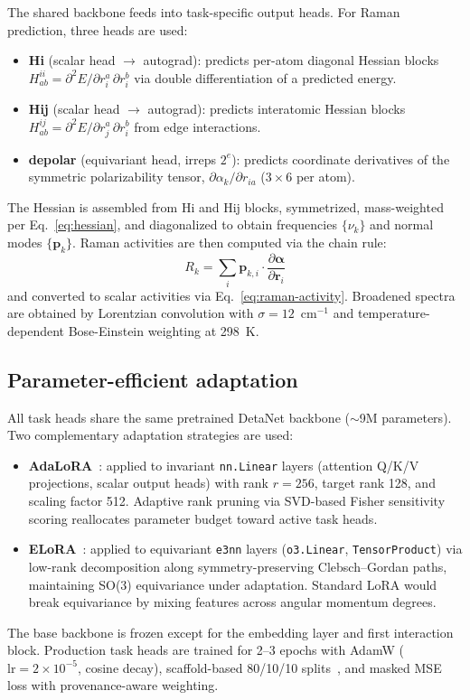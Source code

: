 \documentclass[10pt]{article}
\begin{document}
The shared backbone feeds into task-specific output heads. For Raman prediction, three heads are used:

\begin{itemize}
    \item \textbf{Hi} (scalar head $\to$ autograd): predicts per-atom diagonal Hessian blocks $H^{ii}_{ab} = \partial^2 E / \partial r^a_i\, \partial r^b_i$ via double differentiation of a predicted energy.
    \item \textbf{Hij} (scalar head $\to$ autograd): predicts interatomic Hessian blocks $H^{ij}_{ab} = \partial^2 E / \partial r^a_j\, \partial r^b_i$ from edge interactions.
    \item \textbf{depolar} (equivariant head, irreps $2^e$): predicts coordinate derivatives of the symmetric polarizability tensor, $\partial\alpha_k / \partial r_{ia}$ ($3 \times 6$ per atom).
\end{itemize}

The Hessian is assembled from Hi and Hij blocks, symmetrized, mass-weighted per Eq.~\ref{eq:hessian}, and diagonalized to obtain frequencies $\{\nu_k\}$ and normal modes $\{\mathbf{p}_k\}$. Raman activities are then computed via the chain rule:
\begin{equation}
    R_k = \sum_i \mathbf{p}_{k,i} \cdot \frac{\partial\bm{\alpha}}{\partial \mathbf{r}_i}
    \label{eq:chain-rule}
\end{equation}
and converted to scalar activities via Eq.~\ref{eq:raman-activity}. Broadened spectra are obtained by Lorentzian convolution with $\sigma = 12$~cm$^{-1}$ and temperature-dependent Bose-Einstein weighting at 298~K.

\subsection{Parameter-efficient adaptation}

All task heads share the same pretrained DetaNet backbone ($\sim$9M parameters). Two complementary adaptation strategies are used:
\begin{itemize}
    \item \textbf{AdaLoRA}~\citep{zhang2023adalora}: applied to invariant \texttt{nn.Linear} layers (attention Q/K/V projections, scalar output heads) with rank $r=256$, target rank 128, and scaling factor 512. Adaptive rank pruning via SVD-based Fisher sensitivity scoring reallocates parameter budget toward active task heads.
    \item \textbf{ELoRA}~\citep{elora}: applied to equivariant \texttt{e3nn} layers (\texttt{o3.Linear}, \texttt{TensorProduct}) via low-rank decomposition along symmetry-preserving Clebsch--Gordan paths, maintaining SO(3) equivariance under adaptation. Standard LoRA would break equivariance by mixing features across angular momentum degrees.
\end{itemize}
The base backbone is frozen except for the embedding layer and first interaction block. Production task heads are trained for 2--3 epochs with AdamW ($\mathrm{lr} = 2 \times 10^{-5}$, cosine decay), scaffold-based 80/10/10 splits~\citep{deng2023systematic}, and masked MSE loss with provenance-aware weighting.
\end{document}
